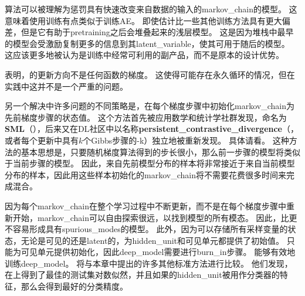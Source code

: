 
算法可以被理解为惩罚具有快速改变来自数据的输入的\gls{markov_chain}的模型。
这意味着使用训练有点类似于训练\gls{AE}。
即使估计比一些其他训练方法具有更大偏差，但是它有助于\gls{pretraining}之后会堆叠起来的浅层模型。
这是因为堆栈中最早的模型会受激励复制更多的信息到其\gls{latent_variable}，使其可用于随后的模型。
这应该更多地被认为是训练中经常可利用的副产品，而不是原本的设计优势。


\cite{sutskever2010convergence-small}表明，的更新方向不是任何函数的梯度。
这使得可能存在永久循环的情况，但在实践中这并不是一个严重的问题。


另一个解决中许多问题的不同策略是，在每个梯度步骤中初始化\gls{markov_chain}为先前梯度步骤的状态值。
这个方法首先被应用数学和统计学社群发现，命名为\textbf{\gls{SML}}（）\citep{Younes98onthe}，后来又在\gls{DL}社区中以名称\textbf{\gls{persistent_contrastive_divergence}}（，或者每个更新中具有$k$个Gibbs步骤的-k）独立地被重新发现\citep{Tieleman08-small}。
具体请看。
这种方法的基本思想是，只要随机梯度算法得到的步长很小，那么前一步骤的模型将类似于当前步骤的模型。
因此，来自先前模型分布的样本将非常接近于来自当前模型分布的样本，因此用这些样本初始化的\gls{markov_chain}将不需要花费很多时间来完成混合。


因为每个\gls{markov_chain}在整个学习过程中不断更新，而不是在每个梯度步骤中重新开始，\gls{markov_chain}可以自由探索很远，以找到模型的所有模态。 
因此，比更不容易形成具有\gls{spurious_modes}的模型。
此外，因为可以存储所有采样变量的状态，无论是可见的还是\gls{latent}的，为\gls{hidden_unit}和可见单元都提供了初始值。
只能为可见单元提供初始化，因此\gls{deep_model}需要进行\gls{burn_in}步骤。
能够有效地训练\gls{deep_model}。
\cite{Marlin10Inductive-small}将与本章中提出的许多其他标准方法进行比较。
他们发现，在上得到了最佳的测试集对数似然，并且如果的\gls{hidden_unit}被用作分类器的特征，那么会得到最好的分类精度。


